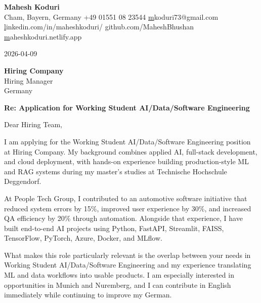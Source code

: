 \documentclass[11pt,a4paper]{letter}
\begin{document}
\begin{center}
    {\LARGE \textbf{ Mahesh Koduri }}\\[0.3cm]
     Cham, Bayern, Germany \quad
     +49 01551 08 23544 \quad
     \href{mailto:mkoduri73@gmail.com}mkoduri73@gmail.com\\[0.2cm]
     \href{https://linkedin.com/in/maheshkoduri/}linkedin.com/in/maheshkoduri/ \quad
     \href{https://github.com/MaheshBhushan}github.com/MaheshBhushan \quad
     \href{https://maheshkoduri.netlify.app}maheshkoduri.netlify.app
\end{center}

\vspace{0.5cm}

2026-04-09

\vspace{0.5cm}

\textbf{ Hiring Company }\\
Hiring Manager\\
Germany

\vspace{0.5cm}

\textbf{Re: Application for Working Student AI/Data/Software Engineering}

\vspace{0.5cm}

Dear Hiring Team,

I am applying for the Working Student AI/Data/Software Engineering position at Hiring Company. My background combines applied AI, full-stack development, and cloud deployment, with hands-on experience building production-style ML and RAG systems during my master's studies at Technische Hochschule Deggendorf.

At People Tech Group, I contributed to an automotive software initiative that reduced system errors by 15\%, improved user experience by 30\%, and increased QA efficiency by 20\% through automation. Alongside that experience, I have built end-to-end AI projects using Python, FastAPI, Streamlit, FAISS, TensorFlow, PyTorch, Azure, Docker, and MLflow.

What makes this role particularly relevant is the overlap between your needs in Working Student AI/Data/Software Engineering and my experience translating ML and data workflows into usable products. I am especially interested in opportunities in Munich and Nuremberg, and I can contribute in English immediately while continuing to improve my German.
\end{document}
